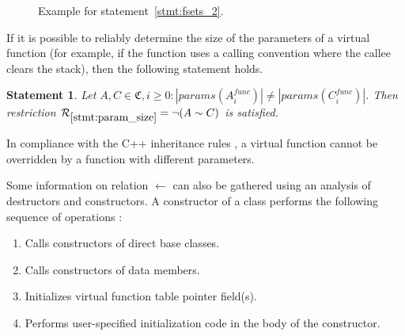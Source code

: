 \documentclass[times, 10pt,twocolumn]{article}
\newcommand{\gC}{\mathfrak{C}}
\newcommand{\cR}{\mathcal{R}}
\newcommand{\params}{\textit{params}}
\newcommand{\func}{\textit{func}}
\newtheorem{statement}{Statement}
\begin{document}
\begin{figure}[htb!]
\begin{center}
  \end{center}
\caption{Example for statement~\ref{stmt:fsets_2}.}
\end{figure}

If it is possible to reliably determine the size of the parameters
of a virtual function (for example, if the function uses
a calling convention where the callee clears the stack),
then the following statement holds.
\begin{statement}\label{stmt:param_size}
Let $A, C \in \gC, i \ge 0: |\params(A_i^{\func})| \ne |\params(C_i^{\func})|$.
Then restriction $\cR_{\ref{stmt:param_size}} = \neg (A \sim C)$ is satisfied.
\end{statement}
In compliance with the C++ inheritance rules \cite{cpp03},
a virtual function cannot be overridden by a function with different parameters.

Some information on relation $\leftarrow$ can also be gathered
using an analysis of destructors and constructors.
A constructor of a class performs the following sequence
of operations \cite{cpp03, gray94}:
\begin{enumerate}\compact
\item Calls constructors of direct base classes.
\item Calls constructors of data members.
\item Initializes virtual function table pointer field(s).
\item Performs user-specified initialization code in the body
of the constructor.
\end{enumerate}
\end{document}
